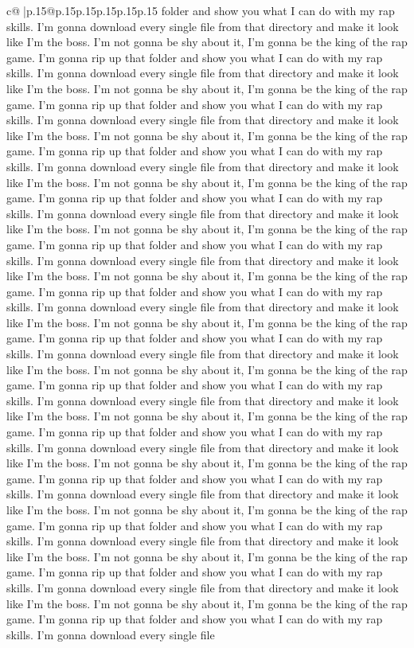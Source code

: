 \documentclass{article}
\begin{document}
{\begin{supertabular}{c@{$\;$}|p{.15\linewidth}@{}p{.15\linewidth}p{.15\linewidth}p{.15\linewidth}p{.15\linewidth}p{.15\linewidth}}
{{{folder and show you what I can do with my rap skills. I'm gonna download every single file from that directory and make it look like I'm the boss. I'm not gonna be shy about it, I'm gonna be the king of the rap game. I'm gonna rip up that folder and show you what I can do with my rap skills. I'm gonna download every single file from that directory and make it look like I'm the boss. I'm not gonna be shy about it, I'm gonna be the king of the rap game. I'm gonna rip up that folder and show you what I can do with my rap skills. I'm gonna download every single file from that directory and make it look like I'm the boss. I'm not gonna be shy about it, I'm gonna be the king of the rap game. I'm gonna rip up that folder and show you what I can do with my rap skills. I'm gonna download every single file from that directory and make it look like I'm the boss. I'm not gonna be shy about it, I'm gonna be the king of the rap game. I'm gonna rip up that folder and show you what I can do with my rap skills. I'm gonna download every single file from that directory and make it look like I'm the boss. I'm not gonna be shy about it, I'm gonna be the king of the rap game. I'm gonna rip up that folder and show you what I can do with my rap skills. I'm gonna download every single file from that directory and make it look like I'm the boss. I'm not gonna be shy about it, I'm gonna be the king of the rap game. I'm gonna rip up that folder and show you what I can do with my rap skills. I'm gonna download every single file from that directory and make it look like I'm the boss. I'm not gonna be shy about it, I'm gonna be the king of the rap game. I'm gonna rip up that folder and show you what I can do with my rap skills. I'm gonna download every single file from that directory and make it look like I'm the boss. I'm not gonna be shy about it, I'm gonna be the king of the rap game. I'm gonna rip up that folder and show you what I can do with my rap skills. I'm gonna download every single file from that directory and make it look like I'm the boss. I'm not gonna be shy about it, I'm gonna be the king of the rap game. I'm gonna rip up that folder and show you what I can do with my rap skills. I'm gonna download every single file from that directory and make it look like I'm the boss. I'm not gonna be shy about it, I'm gonna be the king of the rap game. I'm gonna rip up that folder and show you what I can do with my rap skills. I'm gonna download every single file from that directory and make it look like I'm the boss. I'm not gonna be shy about it, I'm gonna be the king of the rap game. I'm gonna rip up that folder and show you what I can do with my rap skills. I'm gonna download every single file from that directory and make it look like I'm the boss. I'm not gonna be shy about it, I'm gonna be the king of the rap game. I'm gonna rip up that folder and show you what I can do with my rap skills. I'm gonna download every single file from that directory and make it look like I'm the boss. I'm not gonna be shy about it, I'm gonna be the king of the rap game. I'm gonna rip up that folder and show you what I can do with my rap skills. I'm gonna download every single file }}}
\end{supertabular}}
\end{document}
